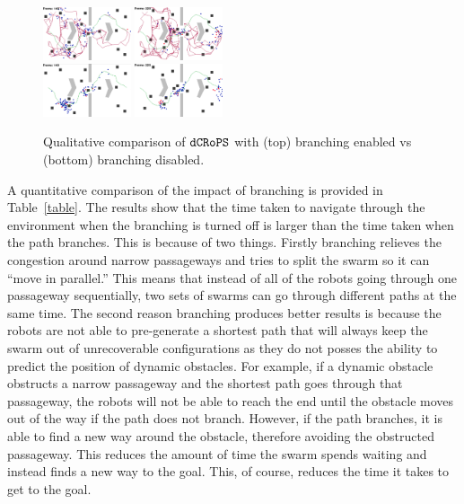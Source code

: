 \documentclass[letterpaper, 10pt, conference]{ieeeconf}
\newcommand{\Acronym}[1]{\ensuremath{{\small{\texttt{#1}}}}}
\newcommand{\Name}{\Acronym{dCRoPS}}
\begin{document}
\begin{figure}
\centering
\includegraphics[width=0.23\textwidth,frame]{figs/hurdles_branching_1.png}
\includegraphics[width=0.23\textwidth,frame]{figs/hurdles_branching_2.png}\\
\includegraphics[width=0.23\textwidth,frame]{figs/hurdles_no_branching_1.png}
\includegraphics[width=0.23\textwidth,frame]{figs/hurdles_no_branching_2.png}
\caption{Qualitative comparison of $\Name$ with (top) branching enabled
  vs (bottom) branching disabled.}
\label{fig:Branch1}
\end{figure}

A quantitative comparison of the impact of branching is provided in
Table~\ref{table}.  The results show  that the time taken to navigate through
the environment when the branching is turned off is larger than the
time taken when the path branches. This is because of two
things. Firstly branching relieves the congestion around narrow
passageways and tries to split the swarm so it can ``move in
parallel.'' This means that instead of all of the robots going through
one passageway sequentially, two sets of swarms can go through
different paths at the same time. The second reason branching produces
better results is because the robots are not able to pre-generate a
shortest path that will always keep the swarm out of unrecoverable
configurations as they do not posses the ability to predict the
position of dynamic obstacles.  For example, if a dynamic obstacle
obstructs a narrow passageway and the shortest path goes through that
passageway, the robots will not be able to reach the end until the
obstacle moves out of the way if the path does not branch. However, if
the path branches, it is able to find a new way around the obstacle,
therefore avoiding the obstructed passageway. This reduces the amount
of time the swarm spends waiting and instead finds a new way to the
goal. This, of course, reduces the time it takes to get to the goal.
\end{document}
